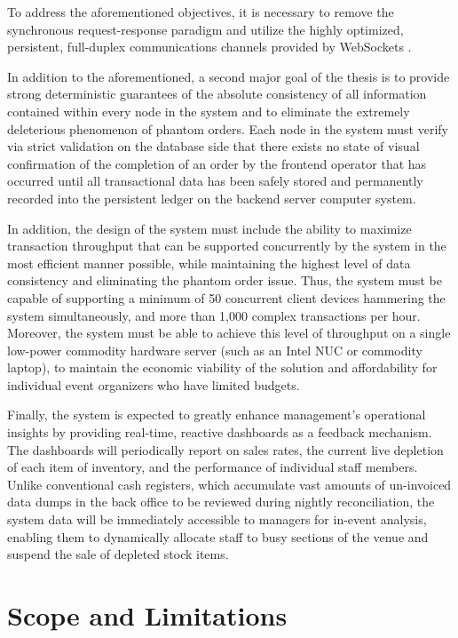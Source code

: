 To address the aforementioned objectives, it is necessary to remove the synchronous request-response paradigm and utilize the highly optimized, persistent, full-duplex communications channels provided by WebSockets \cite{fette2011websocket, mdn2023websocket}.

In addition to the aforementioned, a second major goal of the thesis is to provide strong deterministic guarantees of the absolute consistency of all information contained within every node in the system and to eliminate the extremely deleterious phenomenon of phantom orders. Each node in the system must verify via strict validation on the database side that there exists no state of visual confirmation of the completion of an order by the frontend operator that has occurred until all transactional data has been safely stored and permanently recorded into the persistent ledger on the backend server computer system.

In addition, the design of the system must include the ability to maximize transaction throughput that can be supported concurrently by the system in the most efficient manner possible, while maintaining the highest level of data consistency and eliminating the phantom order issue. Thus, the system must be capable of supporting a minimum of 50 concurrent client devices hammering the system simultaneously, and more than 1,000 complex transactions per hour. Moreover, the system must be able to achieve this level of throughput on a single low-power commodity hardware server (such as an Intel NUC or commodity laptop), to maintain the economic viability of the solution and affordability for individual event organizers who have limited budgets.

Finally, the system is expected to greatly enhance management's operational insights by providing real-time, reactive dashboards as a feedback mechanism. The dashboards will periodically report on sales rates, the current live depletion of each item of inventory, and the performance of individual staff members. Unlike conventional cash registers, which accumulate vast amounts of un-invoiced data dumps in the back office to be reviewed during nightly reconciliation, the system data will be immediately accessible to managers for in-event analysis, enabling them to dynamically allocate staff to busy sections of the venue and suspend the sale of depleted stock items.

\section{Scope and Limitations}

